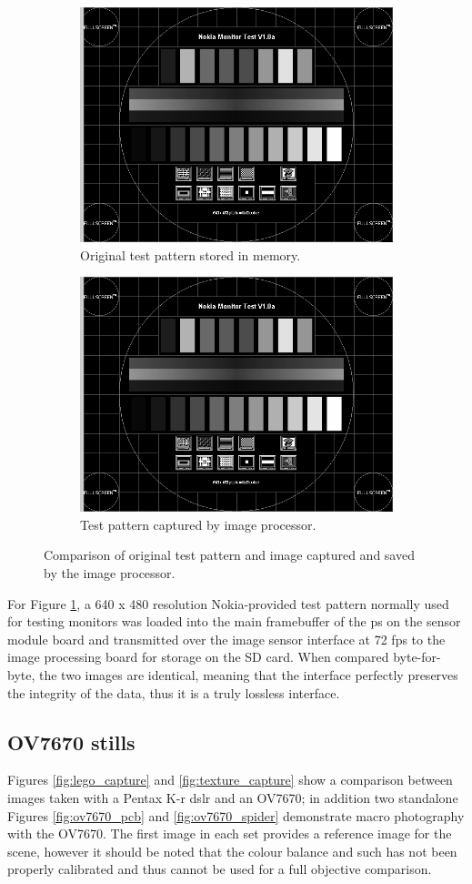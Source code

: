 \begin{figure}
\centering
\begin{subfigure}{.5\textwidth}
  \centering
  \includegraphics[width=.4\linewidth]{./img/ov7670_test_pattern_capture.png}
  \caption{Original test pattern stored in memory.}
\end{subfigure}%
\begin{subfigure}{.5\textwidth}
  \centering
  \includegraphics[width=.4\linewidth]{./img/ov7670_test_pattern_capture.png}
  \caption{Test pattern captured by image processor.}
\end{subfigure}
\label{fig:test_pattern_capture}
\caption{Comparison of original test pattern and image captured and saved by the image processor.}
\end{figure}

For Figure \ref{fig:test_pattern_capture}, a 640 x 480 resolution Nokia-provided test pattern normally used for testing monitors was loaded into the main framebuffer of the \gls{ps} on the sensor module board and transmitted over the image sensor interface at 72 \gls{fps} to the image processing board for storage on the SD card. When compared byte-for-byte, the two images are identical, meaning that the interface perfectly preserves the integrity of the data, thus it is a truly lossless interface.

\subsection{OV7670 stills}

Figures \ref{fig:lego_capture} and \ref{fig:texture_capture} show a comparison between images taken with a Pentax K-r \gls{dslr} and an OV7670; in addition two standalone Figures \ref{fig:ov7670_pcb} and \ref{fig:ov7670_spider} demonstrate macro photography with the OV7670. The first image in each set provides a reference image for the scene, however it should be noted that the colour balance and such has not been properly calibrated and thus cannot be used for a full objective comparison.

